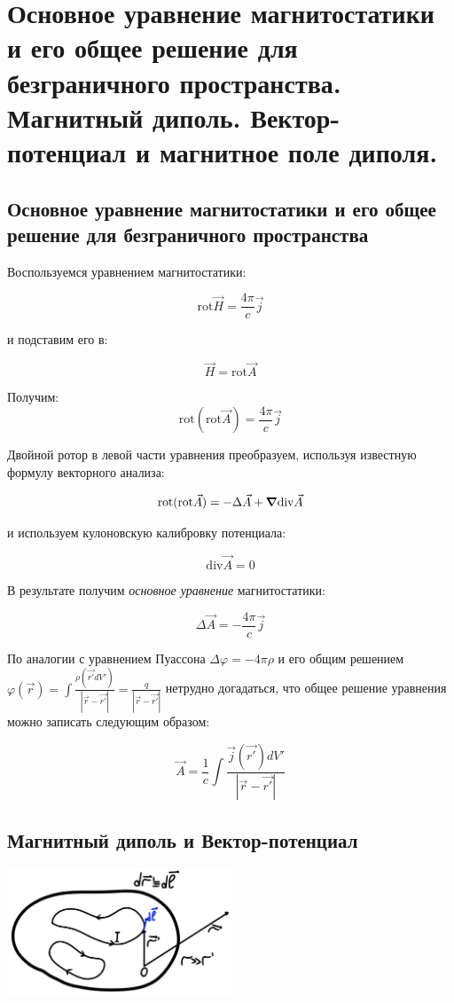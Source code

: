\section{Основное уравнение магнитостатики и его общее решение для
безграничного пространства. Магнитный диполь. Вектор-потенциал и
магнитное поле диполя.}
 
\subsection*{Основное уравнение магнитостатики и его общее решение для
безграничного пространства}

Воспользуемся уравнением магнитостатики:

\[
\mathrm{rot}\vec{H}=\frac{4\pi}{c}\vec{j}  
\]

и подставим его в:

\[
\vec{H}=\mathrm{rot}\vec{A}
\]

Получим:
\[
\mathrm{rot}(\mathrm{rot}\vec{A} )=\frac{4\pi}{c}\vec{j}  
\]

Двойной ротор в левой части уравнения преобразуем, используя известную формулу векторного анализа:

\[
\mathrm{rot}(\mathrm{rot}\vec{A} )=-\Delta \vec{A}+ \grad \mathrm{div}\vec{A} 
\]

и используем кулоновскую калибровку потенциала:

\[
\mathrm{div}\vec{A}=0 
\]

В результате получим \textit {основное уравнение} магнитостатики:

\[
\boxed{\Delta \vec{A}=-\frac{4\pi}{c}\vec{j} }
\]

По аналогии с уравнением Пуассона $\Delta\varphi=-4\pi\rho$ и его общим решением $\varphi(\vec{r})=\int \frac{\rho(\vec{r'}dV')}{|\vec{r}-\vec{r'}|}=\frac{q}{|\vec{r}-\vec{r'}|}$ нетрудно догадаться, что общее решение уравнения можно записать следующим образом:

\[
\boxed{\vec{A}=\frac{1}{c}\int \frac{\vec{j}(\vec{r'})dV'}{|\vec{r}-\vec{r'}|}  }
\]

\subsection*{Магнитный диполь и Вектор-потенциал }

\begin{center}
    \includegraphics[width=0.5\textwidth]{im/69.png}
\end{center}


